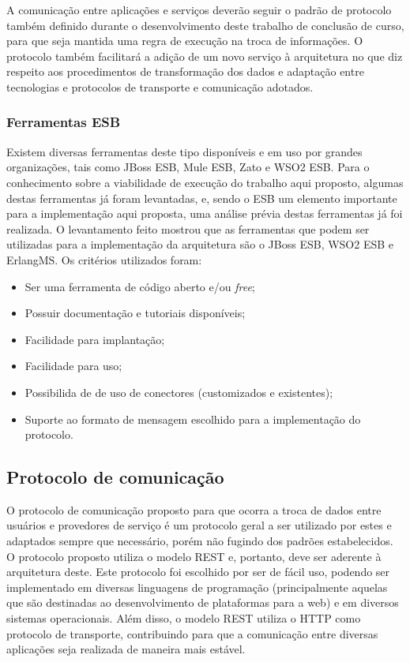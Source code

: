 A comunicação entre aplicações e serviços deverão seguir o padrão de protocolo também definido durante o desenvolvimento deste trabalho de conclusão de curso, para que seja mantida uma regra de execução na troca de informações. O protocolo também facilitará a adição de um novo serviço à arquitetura no que diz respeito aos procedimentos de transformação dos dados e adaptação entre tecnologias e protocolos de transporte e comunicação adotados.

\subsubsection{Ferramentas ESB}
Existem diversas ferramentas deste tipo disponíveis e em uso por grandes organizações, tais como JBoss ESB, Mule ESB, Zato e WSO2 ESB. Para o conhecimento sobre a viabilidade de execução do trabalho aqui proposto, algumas destas ferramentas já foram levantadas, e, sendo o ESB um elemento importante para a implementação aqui proposta, uma análise prévia destas ferramentas já foi realizada. O levantamento feito mostrou que as ferramentas que podem ser utilizadas para a implementação da arquitetura são o JBoss ESB, WSO2 ESB e ErlangMS. Os critérios utilizados foram:

\begin{itemize}
\item Ser uma ferramenta de código aberto e/ou \textit{free};
\item Possuir documentação e tutoriais disponíveis;
\item Facilidade para implantação;
\item Facilidade para uso;
\item Possibilida de de uso de conectores (customizados e existentes);
\item Suporte ao formato de mensagem escolhido para a implementação do protocolo.
\end{itemize}

\subsection{Protocolo de comunicação}
O protocolo de comunicação proposto para que ocorra a troca de dados entre usuários e provedores de serviço é um protocolo geral a ser utilizado por estes e adaptados sempre que necessário, porém não fugindo dos padrões estabelecidos. O protocolo proposto utiliza o modelo REST e, portanto, deve ser aderente à arquitetura deste. Este protocolo foi escolhido por ser de fácil uso, podendo ser implementado em diversas linguagens de programação (principalmente aquelas que são destinadas ao desenvolvimento de plataformas para a web) e em diversos sistemas operacionais. Além disso, o modelo REST utiliza o HTTP como protocolo de transporte, contribuindo para que a comunicação entre diversas aplicações seja realizada de maneira mais estável.

